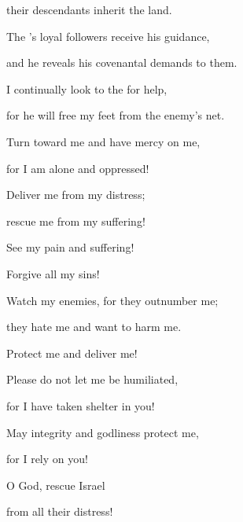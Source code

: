 {\par }{\Q their descendants
inherit
the land.
\par }{\Q {}The
{}’s
loyal followers
receive his guidance,
\par }{\Q and he reveals his covenantal
demands to them.
\par }{\Q {}I continually
look
to
the {}
for help,

\par }{\Q for
he
will free
my feet
from the enemy’s net.
\par }{\Q {}Turn
toward me
and have mercy
on me,
\par }{\Q for
I am
alone
and oppressed!
\par }{\Q {}Deliver
me
from my distress;
\par }{\Q rescue me from my suffering!
\par }{\Q {}See
my pain
and suffering!
\par }{\Q Forgive
all
my sins!
\par }{\Q {}Watch
my enemies,
for
they outnumber
me;
\par }{\Q they hate
me and want to harm
me.
\par }{\Q {}Protect
me
and deliver
me!
\par }{\Q Please do not
let me be humiliated,
\par }{\Q for
I have taken shelter in you!
\par }{\Q {}May integrity
and godliness
protect
me,
\par }{\Q for
I rely on you!
\par }{\Q {}O God,
rescue
Israel
\par }{\Q from all
their distress!


\par }

